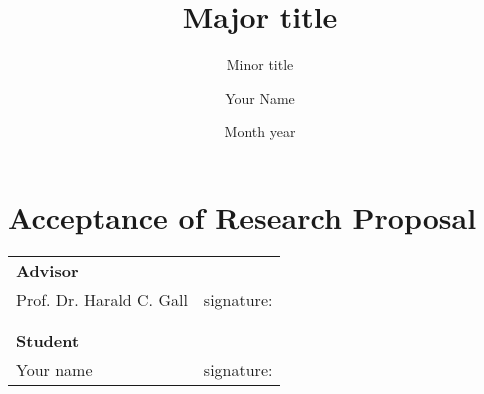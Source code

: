 \documentclass{seal_phd_proposal}
\title{Major title}
\subtitle{Minor title}
\author{Your Name}
\date{Month year}
\begin{document}
\maketitle










\clearpage
\section*{Acceptance of Research Proposal}
\vspace*{1cm}
\begin{tabular}{p{6cm}p{7cm}}
{\bfseries Advisor}\\
Prof. Dr. Harald C. Gall & signature:\dotfill \\
\\
\\
{\bfseries Student}\\
Your name & signature:\dotfill
\end{tabular}

 


\end{document}
